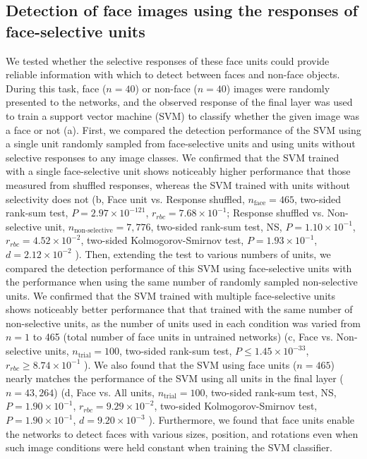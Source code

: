 \documentclass[final,3p,times,twocolumn]{elsarticle}
\begin{document}
\subsection{Detection of face images using the responses of face-selective units}
We tested whether the selective responses of these face units could provide reliable information with which to detect between faces and non-face objects.
During this task, face ($ n=40 $) or non-face ($ n=40 $) images were randomly presented to the networks, and the observed response of the final layer was used to train a support vector machine (SVM) to classify whether the given image was a face or not (a).
First, we compared the detection performance of the SVM using a single unit randomly sampled from face-selective units and using units without selective responses to any image classes.
We confirmed that the SVM trained with a single face-selective unit shows noticeably higher performance that those measured from shuffled responses, whereas the SVM trained with units without selectivity does not 
(b,
Face unit vs. Response shuffled, 
$ n_\textrm{face} = 465 $,
two-sided rank-sum test,
$ P = 2.97 \times 10 ^{-121} $,
$ r_{rbc} = 7.68 \times 10^{-1} $;
Response shuffled vs. Non-selective unit, 
$ n_\textrm{non-selective} = 7,776 $,
two-sided rank-sum test, NS, 
$ P = 1.10 \times 10^{-1} $,
$ r_{rbc} = 4.52 \times 10^{-2} $,
two-sided Kolmogorov-Smirnov test,
$ P = 1.93 \times 10^{-1} $,
$ d = 2.12 \times 10^{-2} $
).
Then, extending the test to various numbers of units, we compared the detection performance of this SVM using face-selective units with the performance when using the same number of randomly sampled non-selective units.
We confirmed that the SVM trained with multiple face-selective units shows noticeably better performance that that trained with the same number of non-selective units, 
as the number of units used in each condition was varied from $ n=1 $ to 465 (total number of face units in untrained networks)
(c,
Face vs. Non-selective units, 
$ n_\textrm{trial} = 100 $,
two-sided rank-sum test, 
$ P \leq 1.45 \times 10^{-33} $,
$ r_{rbc} \geq 8.74 \times 10^{-1} $
).
We also found that the SVM using face units ($ n=465 $) nearly matches the performance of the SVM using all units in the final layer ($ n=43,264 $)
(d, 
Face vs. All units, 
$ n_\textrm{trial} = 100 $,
two-sided rank-sum test, NS, 
$ P = 1.90 \times 10^{-1} $,
$ r_{rbc} = 9.29 \times 10^{-2} $,
two-sided Kolmogorov-Smirnov test,
$ P = 1.90 \times 10^{-1} $,
$ d = 9.20 \times 10^{-3} $
).
Furthermore, we found that face units enable the networks to detect faces with various sizes, position, and rotations even when such image conditions were held constant when training the SVM classifier.
\end{document}
